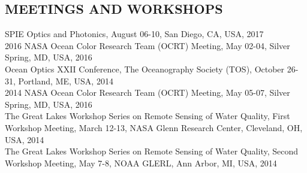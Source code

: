 \documentclass[11pt]{res}
\begin{document}
\begin{resume}
\vspace{-0.2in}
\section{MEETINGS AND WORKSHOPS}
\vspace{0.1in}
SPIE Optics and Photonics,  August 06-10, San Diego, CA, USA, 2017
\vspace{0.1in}\\
2016 NASA Ocean Color Research Team (OCRT) Meeting,  May 02-04, Silver Spring, MD, USA, 2016
\vspace{0.1in}\\
Ocean Optics XXII Conference, The Oceanography Society (TOS),  October 26-31, Portland, ME, USA, 2014
\vspace{0.1in}\\
2014 NASA Ocean Color Research Team (OCRT) Meeting,  May 05-07, Silver Spring, MD, USA, 2016
\vspace{0.1in}\\
The Great Lakes Workshop Series on Remote Sensing of Water Quality, First Workshop Meeting, March 12-13, NASA Glenn Research Center, Cleveland, OH, USA, 2014
\vspace{0.1in}\\
The Great Lakes Workshop Series on Remote Sensing of Water Quality, Second Workshop Meeting, May 7-8, NOAA GLERL, Ann Arbor, MI, USA, 2014\\

\vspace{-0.1in}

\end{resume}
\end{document}
